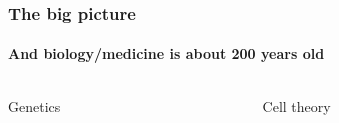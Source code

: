 {
\DarkMode
\begin{frame}
    \frametitle{The big picture}
    \framesubtitle{And biology/medicine is about 200 years old}

    \begin{columns}
        \begin{column}{0.5\textwidth}
            \begin{center}
                \small{Genetics}
            \end{center}
        \end{column}
        \begin{column}{0.5\textwidth}
            \begin{center}
                \small{Cell theory}
            \end{center}
        \end{column}
    \end{columns}


\end{frame}}
